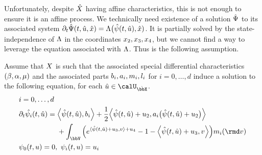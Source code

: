 Unfortunately, despite $\hat{X}$ having affine characteristics, this is not enough to ensure it is an affine process.
We technically need existence of a solution $\hat{\Psi}$ to its associated system $\partial_t\hat{\Psi}(t, \hat{u}, \hat{x}) = \Lambda\big(\hat{\psi}(t, \hat{u}), \hat{x})$.
It is partially solved by the state-independence of $\Lambda$ in the coordinates $x_2, x_3, x_4$, but we cannot find a way to leverage the equation associated with $\Lambda$.
Thus is the following assumption.
\begin{assumption}
  \label{assumption:joint-affine}
  Assume that $X$ is such that the associated special differential characteristics $(\beta, \alpha, \mu)$ and the associated parts $b_i, a_i, m_i, l_i$ for $i = 0, \ldots, d$ induce a solution to the following equation, for each $\hat\momentVar\in\boundedSpaceJoint$.
  \begin{equation*}
    \begin{aligned}[t]
      &i = 0, \ldots, d \\
      & \partial_t\hat{\affPart_i}(t, \hat\momentVar) = \begin{aligned}[t]
        &\Bprj{\hat\affPart(t, \hat\momentVar)}{\affDriftPart_i} +  \frac12\Bprj{\hat\affPart(t, \hat\momentVar)+\momentVar_2}{\affDiffPart_i\big(\hat\affPart(t,\hat\momentVar)+\momentVar_2\big)} \\
        &+ \int_\vecSpace \Big( e^{\prj{\hat\affPart(t,\hat\momentVar) + \momentVar_3}{\markVar} + \momentVar_4} - 1 - \Bprj{\hat\affPart(t,\hat\momentVar) + \momentVar_3}{\markVar} \Big) \affJumpPart_i(\rmd\markVar) 
      \end{aligned} \\
      & \affPart_0(t, \momentVar) = 0, ~ \affPart_i(t, \momentVar) = \momentVar_i
    \end{aligned}
  \end{equation*}
\end{assumption}
